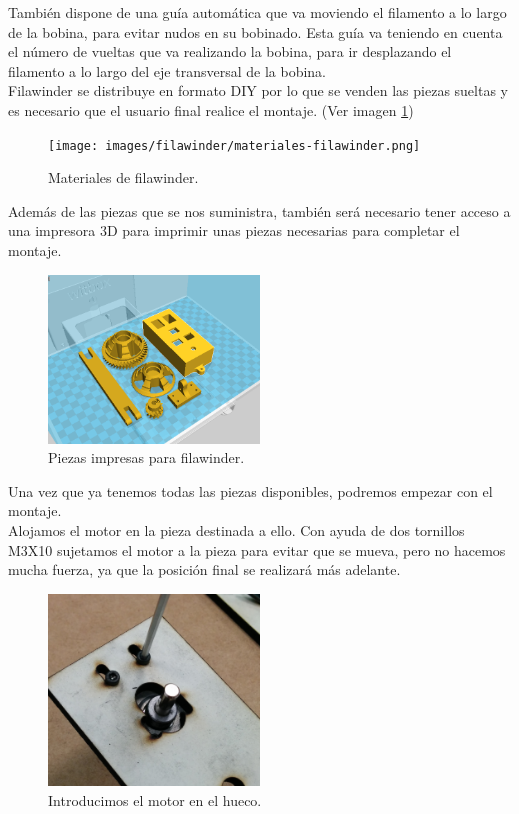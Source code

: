 También dispone de una guía automática que va moviendo el filamento a lo largo de la bobina, para evitar nudos en su bobinado. Esta guía va teniendo en cuenta el número de vueltas que va realizando la bobina, para ir desplazando el filamento a lo largo del eje transversal de la bobina.\\

Filawinder se distribuye en formato DIY por lo que se venden las piezas sueltas y es necesario que el usuario final realice el montaje. (Ver imagen \ref{fig:winder_material})
\begin{figure}[H]
    \centering
    \texttt{[image: images/filawinder/materiales-filawinder.png]}
    \caption{Materiales de filawinder.}
    \label{fig:winder_material}
\end{figure}

Además de las piezas que se nos suministra, también será necesario tener acceso a una impresora 3D para imprimir unas piezas necesarias para completar el montaje.

\begin{figure}[H]
    \centering
    \includegraphics[width=0.5\textwidth]{images/filawinder/piezas-impresas.png}
    \caption{Piezas impresas para filawinder.}
    \label{fig:winder_piezas}
\end{figure}

 Una vez que ya tenemos todas las piezas disponibles, podremos empezar con el montaje.\\

Alojamos el motor en la pieza destinada a ello. Con ayuda de dos tornillos M3X10 sujetamos el motor a la pieza para evitar que se mueva, pero no hacemos mucha fuerza, ya que la posición final se realizará más adelante.

\begin{figure}[H]
    \centering
    \includegraphics[width=0.5\textwidth]{images/filawinder/montaje1.png}
    \caption{Introducimos el motor en el hueco.}
    \label{fig:winder_piezas}
\end{figure}

